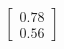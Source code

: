 \documentclass[preview]{standalone}
\begin{document}
\begin{align*}
\begin{bmatrix} 0.78 \\ 0.56 \end{bmatrix}
\end{align*}
\end{document}
